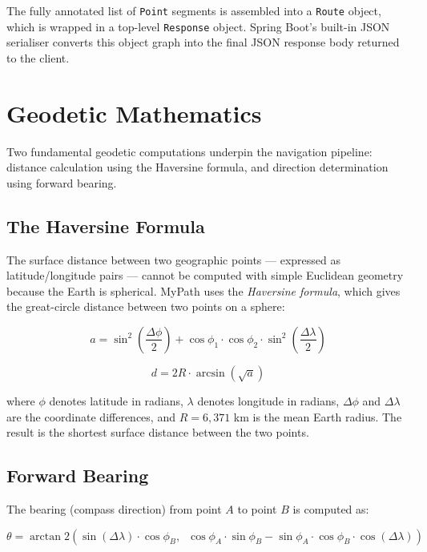 \documentclass[12pt, a4paper]{report}
\begin{document}
The fully annotated list of \texttt{Point} segments is assembled into a \texttt{Route} object, which is wrapped in a top-level \texttt{Response} object. Spring Boot's built-in JSON serialiser converts this object graph into the final JSON response body returned to the client.

\section{Geodetic Mathematics}
\label{sec:geomath}

Two fundamental geodetic computations underpin the navigation pipeline: distance calculation using the Haversine formula, and direction determination using forward bearing.

\subsection{The Haversine Formula}
\label{subsec:haversine}

The surface distance between two geographic points — expressed as latitude/longitude pairs — cannot be computed with simple Euclidean geometry because the Earth is spherical. MyPath uses the \emph{Haversine formula}, which gives the great-circle distance between two points on a sphere:

\begin{equation}
  a = \sin^2\!\left(\frac{\Delta\phi}{2}\right) + \cos\phi_1 \cdot \cos\phi_2 \cdot \sin^2\!\left(\frac{\Delta\lambda}{2}\right)
\end{equation}

\begin{equation}
  d = 2R \cdot \arcsin\!\left(\sqrt{a}\right)
\end{equation}

where $\phi$ denotes latitude in radians, $\lambda$ denotes longitude in radians, $\Delta\phi$ and $\Delta\lambda$ are the coordinate differences, and $R = 6{,}371$ km is the mean Earth radius. The result is the shortest surface distance between the two points.

\subsection{Forward Bearing}
\label{subsec:bearing}

The bearing (compass direction) from point $A$ to point $B$ is computed as:

\begin{equation}
  \theta = \arctan2\!\left(\sin(\Delta\lambda)\cdot\cos\phi_B,\;\; \cos\phi_A \cdot \sin\phi_B - \sin\phi_A \cdot \cos\phi_B \cdot \cos(\Delta\lambda)\right)
\end{equation}
\end{document}
